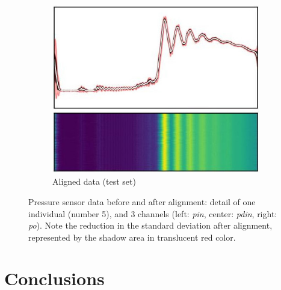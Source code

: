 \begin{figure}[!htb]
\begin{center}
\begin{subfigure}[t]{\linewidth}
            \includegraphics[width=0.32\linewidth]{figures/aligned/plot_heatmap_class_1_detail_3.jpg}
            \caption{Aligned data (test set)}
            \label{fig:phm_alignment_1b}
        \end{subfigure}
        \caption{Pressure sensor data before and after alignment: detail of one individual (number 5), and 3 channels (left: \textit{pin}, center: \textit{pdin}, right: \textit{po}). Note the reduction in the standard deviation after alignment, represented by the shadow area in translucent red color.}
    \label{fig:phm_alignment_1}
    \end{center}
\end{figure}


\section{Conclusions}\label{sec:conclusions_4}

